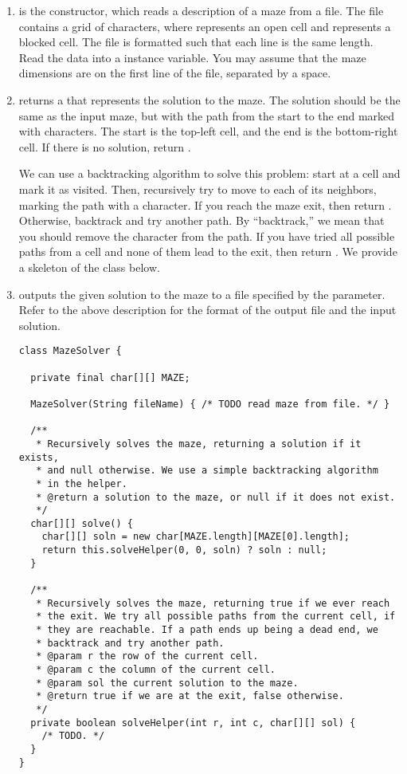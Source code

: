 \begin{enumerate}[label=(\alph*)]
    \item {} is the constructor, which reads a description of a maze from a file. The file contains a grid of characters, where  represents an open cell and  represents a blocked cell. The file is formatted such that each line is the same length. Read the data into a  instance variable. You may assume that the maze dimensions are on the first line of the file, separated by a space.

    \item {} returns a  that represents the solution to the maze. The solution should be the same as the input maze, but with the path from the start to the end marked with  characters. The start is the top-left cell, and the end is the bottom-right cell. If there is no solution, return .

    We can use a backtracking algorithm to solve this problem: start at a cell and mark it as visited. Then, recursively try to move to each of its neighbors, marking the path with a  character. If you reach the maze exit, then return . Otherwise, backtrack and try another path. By ``backtrack,'' we mean that you should remove the  character from the path. If you have tried all possible paths from a cell and none of them lead to the exit, then return . We provide a skeleton of the class below.

    \item {} outputs the given solution to the maze to a file specified by the parameter. Refer to the above description for the format of the output file and the input  solution.

\begin{lstlisting}[language=MyJava]
class MazeSolver {

  private final char[][] MAZE;

  MazeSolver(String fileName) { /* TODO read maze from file. */ }

  /**
   * Recursively solves the maze, returning a solution if it exists, 
   * and null otherwise. We use a simple backtracking algorithm 
   * in the helper.
   * @return a solution to the maze, or null if it does not exist.
   */
  char[][] solve() {
    char[][] soln = new char[MAZE.length][MAZE[0].length];
    return this.solveHelper(0, 0, soln) ? soln : null;
  }

  /**
   * Recursively solves the maze, returning true if we ever reach
   * the exit. We try all possible paths from the current cell, if
   * they are reachable. If a path ends up being a dead end, we 
   * backtrack and try another path.
   * @param r the row of the current cell.
   * @param c the column of the current cell.
   * @param sol the current solution to the maze.
   * @return true if we are at the exit, false otherwise.
   */
  private boolean solveHelper(int r, int c, char[][] sol) { 
    /* TODO. */ 
  }
}
\end{lstlisting}
\end{enumerate}

